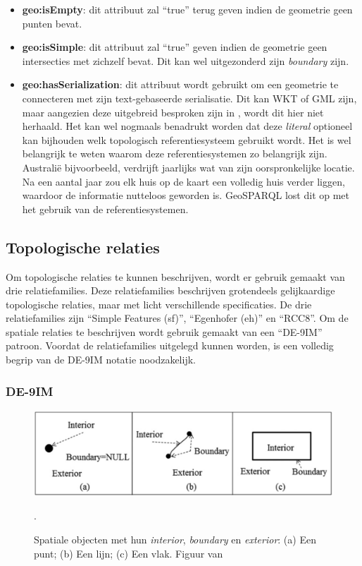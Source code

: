 \begin{itemize}
    \item \textbf{geo:isEmpty}: dit attribuut zal ``true'' terug geven indien de geometrie geen punten bevat.
    \item \textbf{geo:isSimple}: dit attribuut zal ``true'' geven indien de geometrie geen intersecties met zichzelf bevat. Dit kan wel uitgezonderd zijn \textit{boundary} zijn.
    \item \textbf{geo:hasSerialization}: dit attribuut wordt gebruikt om een geometrie te connecteren met zijn text-gebaseerde serialisatie. Dit kan WKT of GML zijn, maar aangezien deze uitgebreid besproken zijn in , wordt dit hier niet herhaald. Het kan wel nogmaals benadrukt worden dat deze \textit{literal} optioneel kan bijhouden welk topologisch referentiesysteem gebruikt wordt. Het is wel belangrijk te weten waarom deze referentiesystemen zo belangrijk zijn. Australië bijvoorbeeld, verdrijft jaarlijks wat van zijn oorspronkelijke locatie. Na een aantal jaar zou elk huis op de kaart een volledig huis verder liggen, waardoor de informatie nutteloos geworden is. GeoSPARQL lost dit op met het gebruik van de referentiesystemen.
\end{itemize}


\subsection{Topologische relaties}
\label{subsec:topologische_relaties}
Om topologische relaties te kunnen beschrijven, wordt er gebruik gemaakt van drie relatiefamilies. Deze relatiefamilies beschrijven grotendeels gelijkaardige topologische relaties, maar met licht verschillende specificaties. De drie relatiefamilies zijn ``Simple Features (sf)'', ``Egenhofer (eh)'' en ``RCC8''. Om de spatiale relaties te beschrijven wordt gebruik gemaakt van een ``DE-9IM'' patroon. Voordat de relatiefamilies uitgelegd kunnen worden, is een volledig begrip van de DE-9IM notatie noodzakelijk.

\subsubsection{DE-9IM}
\begin{figure}[ht]
    \centering
    \includegraphics[width=0.9\linewidth]{images/spatial_objects_DE-9IM.png}
    \caption{Spatiale objecten met hun \textit{interior}, \textit{boundary} en \textit{exterior}: (a) Een punt; (b) Een lijn; (c) Een vlak. Figuur van \cite{shen2018classification}}.
    \label{fig:de-9im}
\end{figure}

